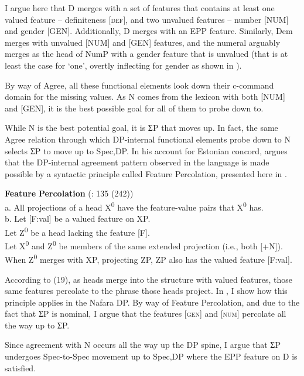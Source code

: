 \documentclass[output=paper]{langscibook}
\begin{document}
I argue here that D merges with a set of features that contains at least one valued feature – definiteness [\textsc{def}], and two unvalued features – number [NUM] and gender [GEN]. Additionally, D merges with an EPP feature. Similarly, Dem merges with unvalued [NUM] and [GEN] features, and the numeral arguably merges as the head of NumP with a gender feature that is unvalued (that is at least the case for ‘one’, overtly inflecting for gender as shown in ).  

By way of Agree, all these functional elements look down their c-command domain for the missing values. As N comes from the lexicon with both [NUM] and [GEN], it is the best possible goal for all of them to probe down to. 

While N is the best potential goal, it is ƩP that moves up. In fact, the same Agree relation through which DP-internal functional elements probe down to N selects ƩP to move up to Spec,DP. In his account for Estonian concord, \citet{Norris2014} argues that the DP-internal agreement pattern observed in the language is made possible by a syntactic principle called Feature Percolation, presented here in .


\ea\label{ex:baron:19}
\textbf{Feature} \textbf{Percolation}    (\citealt{Norris2014}: 135 (242))\\

a.   All projections of a head X\textsuperscript{0} have the feature-value pairs that X\textsuperscript{0} has. \\
 b.   Let [F:val] be a valued feature on XP.\\
   Let Z\textsuperscript{0} be a head lacking the feature [F].\\
   Let X\textsuperscript{0} and Z\textsuperscript{0} be members of the same extended projection (i.e., both [+N]).\\
   When Z\textsuperscript{0} merges with XP, projecting ZP, ZP also has the valued feature [F:val].
\z


According to (19), as heads merge into the structure with valued features, those same features percolate to the phrase those heads project. In , I show how this principle applies in the Nafara DP. By way of Feature Percolation, and due to the fact that ƩP is nominal, I argue that the features \textsc{[gen]} and \textsc{[num]} percolate all the way up to ƩP. 

Since agreement with N occurs all the way up the DP spine, I argue that ƩP undergoes Spec-to-Spec movement up to Spec,DP where the EPP feature on D is satisfied.
\end{document}
